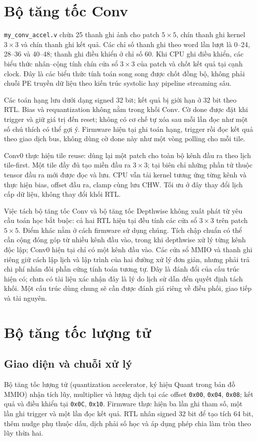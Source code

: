 \section{Bộ tăng tốc Conv}
\texttt{my\_conv\_accel.v} chứa 25 thanh ghi ảnh cho patch $5\times5$, chín thanh ghi kernel $3\times3$ và chín thanh ghi kết quả. Các chỉ số thanh ghi theo word lần lượt là 0--24, 28--36 và 40--48; thanh ghi điều khiển ở chỉ số 60. Khi CPU ghi điều khiển, các biểu thức nhân--cộng tính chín cửa sổ $3\times3$ của patch và chốt kết quả tại cạnh clock. Đây là các biểu thức tính toán song song được chốt đồng bộ, không phải chuỗi PE truyền dữ liệu theo kiến trúc systolic hay pipeline streaming sâu.

Các toán hạng lưu dưới dạng signed 32 bit; kết quả bị giới hạn ở 32 bit theo RTL. Bias và requantization không nằm trong khối Conv. Cờ done được đặt khi trigger và giữ giá trị đến reset; không có cơ chế tự xóa sau mỗi lần đọc như một số chú thích có thể gợi ý. Firmware hiện tại ghi toán hạng, trigger rồi đọc kết quả theo giao dịch bus, không dùng cờ done này như một vòng polling cho mỗi tile.

Conv0 thực hiện tile reuse: dùng lại một patch cho toàn bộ kênh đầu ra theo lịch tile-first. Một tile đầy đủ tạo miền đầu ra $3\times3$; tại biên chỉ những phần tử thuộc tensor đầu ra mới được đọc và lưu. CPU vẫn tải kernel tương ứng từng kênh và thực hiện bias, offset đầu ra, clamp cùng lưu CHW. Tối ưu ở đây thay đổi lịch cấp dữ liệu, không thay đổi khối RTL.


Việc tách bộ tăng tốc Conv và bộ tăng tốc Depthwise không xuất phát từ yêu cầu toán học bắt buộc: cả hai RTL hiện tại đều tính các cửa sổ $3\times3$ trên patch $5\times5$. Điểm khác nằm ở cách firmware sử dụng chúng. Tích chập chuẩn có thể cần cộng đóng góp từ nhiều kênh đầu vào, trong khi depthwise xử lý từng kênh độc lập; Conv0 hiện tại chỉ có một kênh đầu vào. Các cửa sổ MMIO và thanh ghi riêng giữ cách lập lịch và lập trình của hai đường xử lý đơn giản, nhưng phải trả chi phí nhân đôi phần cứng tính toán tương tự. Đây là đánh đổi của cấu trúc hiện có; chưa có tài liệu xác nhận đây là lý do lịch sử dẫn đến quyết định tách khối. Một cấu trúc dùng chung sẽ cần được đánh giá riêng về điều phối, giao tiếp và tài nguyên.

\section{Bộ tăng tốc lượng tử}
\subsection{Giao diện và chuỗi xử lý}
Bộ tăng tốc lượng tử (quantization accelerator, ký hiệu Quant trong bản đồ MMIO) nhận tích lũy, multiplier và lượng dịch tại các offset \texttt{0x00}, \texttt{0x04}, \texttt{0x08}; kết quả và điều khiển tại \texttt{0x0C}, \texttt{0x10}. Firmware thực hiện ba lần ghi tham số, một lần ghi trigger và một lần đọc kết quả. RTL nhân signed 32 bit để tạo tích 64 bit, thêm nudge phụ thuộc dấu, dịch phải số học và áp dụng phép chia làm tròn theo lũy thừa hai.

